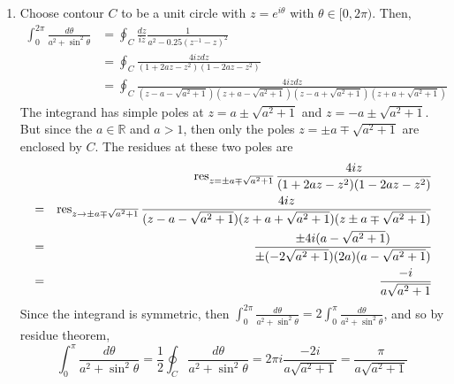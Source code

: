 \documentclass[a4paper]{article}
\begin{document}
\begin{ans}\leavevmode
\begin{enumerate}[label=(\roman*)]
\item Choose contour $C$ to be a unit circle with $z=e^{i\theta}$ with $\theta\in[0,2\pi)$. Then,
\begin{align}
\int_0^{2\pi}\frac{d\theta}{a^2+\sin^2\theta}&=\oint_C\frac{dz}{iz}\frac{1}{a^2-0.25(z^{-1}-z)^2}\nonumber\\&=\oint_C\frac{4izdz}{(1+2az-z^2)(1-2az-z^2)}\nonumber\\&=\oint_C\frac{4izdz}{(z-a-\sqrt{a^2+1})(z+a-\sqrt{a^2+1})(z-a+\sqrt{a^2+1})(z+a+\sqrt{a^2+1})}\nonumber
\end{align}
The integrand has simple poles at $z=a\pm\sqrt{a^2+1}$ and $z=-a\pm\sqrt{a^2+1}$. But since the $a\in\mathbb{R}$ and $a>1$, then only the poles $z=\pm a\mp\sqrt{a^2+1}$ are enclosed by $C$. The residues at these two poles are
\begin{eqnarray}
&&\operatorname{res}_{z=\pm a\mp\sqrt{a^2+1}}\frac{4iz}{(1+2az-z^2)(1-2az-z^2)}\nonumber\\&=&\operatorname{res}_{z\rightarrow \pm a\mp\sqrt{a^2+1}}\frac{4iz}{(z-a-\sqrt{a^2+1})(z+a+\sqrt{a^2+1})(z\pm a\mp\sqrt{a^2+1})}\nonumber\\&=&\frac{\pm4i(a-\sqrt{a^2+1})}{\pm(-2\sqrt{a^2+1})(2a)(a-\sqrt{a^2+1})}\nonumber\\&=&\frac{-i}{a\sqrt{a^2+1}}\nonumber    
\end{eqnarray}
Since the integrand is symmetric, then $\int_0^{2\pi}\frac{d\theta}{a^2+\sin^2\theta}=2\int_0^\pi\frac{d\theta}{a^2+\sin^2\theta}$, and so by residue theorem,
$$\int_0^\pi\frac{d\theta}{a^2+\sin^2\theta}=\frac{1}{2}\oint_C\frac{d\theta}{a^2+\sin^2\theta}=2\pi i\frac{-2i}{a\sqrt{a^2+1}}=\frac{\pi}{a\sqrt{a^2+1}}$$
 \begin{center}
\end{center}
\end{enumerate}
\end{ans}
\end{document}
